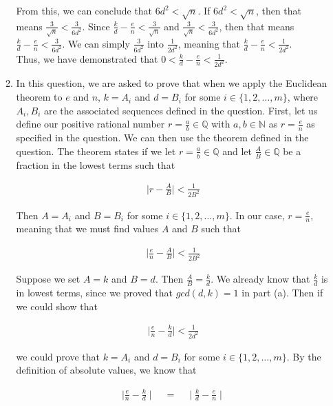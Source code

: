 \documentclass[11pt]{article}
\theoremstyle{definition}
\begin{document}
\begin{enumerate}
\begin{enumerate}
From this, we can conclude that $6d^2 < \sqrt{n}$. If $6d^2 < \sqrt{n}$, then that means $\frac{3}{\sqrt{n}} < \frac{3}{6d^2}$. Since $\frac{k}{d} - \frac{e}{n} < \frac{3}{\sqrt{n}}$ and $\frac{3}{\sqrt{n}} < \frac{3}{6d^2}$, then that means $\frac{k}{d} - \frac{e}{n} < \frac{3}{6d^2}$. We can simply $\frac{3}{6d^2}$ into $\frac{1}{2d^2}$, meaning that $\frac{k}{d} - \frac{e}{n} < \frac{1}{2d^2}$.
\\
Thus, we have demonstrated that $0 < \frac{k}{d} - \frac{e}{n} < \frac{1}{2d^2}$.
\\

\item %

In this question, we are asked to prove that when we apply the Euclidean theorem to $e$ and $n$, $k = A_i$ and $d = B_i$ for some $i \in \{1, 2, \ldots, m\}$, where $A_i, B_i$ are the associated sequences defined in the question. First, let us define our positive rational number $r = \frac{a}{b} \in \mathbb{Q}$ with $a, b \in \mathbb{N}$ as $r = \frac{e}{n}$ as specified in the question. We can then use the theorem defined in the question. The theorem states if we let $r = \frac{a}{b} \in \mathbb{Q}$ and let $\frac{A}{B} \in \mathbb{Q}$ be a fraction in the lowest terms such that

\begin{align*}
    \mid r - \frac{A}{B} \mid < \frac{1}{2B^2}
\end{align*}

Then $A = A_i$ and $B = B_i$ for some $i \in \{1, 2, \ldots, m\}$. In our case, $r = \frac{e}{n}$, meaning that we must find values $A$ and $B$ such that

\begin{align*}
    \mid \frac{e}{n} - \frac{A}{B} \mid < \frac{1}{2B^2}
\end{align*}

Suppose we set $A = k$ and $B = d$. Then $\frac{A}{B} = \frac{k}{d}$. We already know that $\frac{k}{d}$ is in lowest terms, since we proved that $gcd(d, k) = 1$ in part (a). Then if we could show that

\begin{align*}
    \mid \frac{e}{n} - \frac{k}{d} \mid < \frac{1}{2d^2}
\end{align*}


we could prove that $k = A_i$ and $d = B_i$ for some $i \in \{1, 2, \ldots, m\}$. By the definition of absolute values, we know that

\begin{align*}
    \mid \frac{e}{n} - \frac{k}{d} \mid \quad = \quad \mid \frac{k}{d} - \frac{e}{n} \mid
\end{align*}


\end{enumerate}
\end{enumerate}
\end{document}

